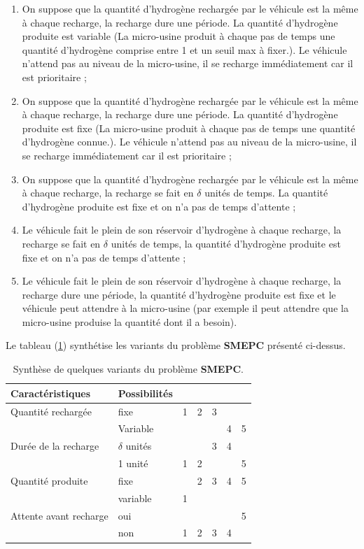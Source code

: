 {\begin{enumerate}%
	\item On suppose que la quantité d'hydrogène rechargée par le véhicule est la même à chaque recharge, la recharge dure une période. La quantité d'hydrogène produite est variable (La micro-usine produit à chaque pas de temps une quantité d'hydrogène comprise entre 1 et un seuil max à fixer.). Le véhicule n'attend pas au niveau de la micro-usine, il se recharge immédiatement car il est prioritaire ;
	\item On suppose que la quantité d'hydrogène rechargée par le véhicule est la même à chaque recharge, la recharge dure une période. La quantité d'hydrogène produite est fixe (La micro-usine produit à chaque pas de temps une quantité d'hydrogène connue.). Le véhicule n'attend pas au niveau de la micro-usine, il se recharge immédiatement car il est prioritaire ;
	\item On suppose que la quantité d'hydrogène rechargée par le véhicule est la même à chaque recharge, la recharge se fait en $\delta$ unités de temps. La quantité d'hydrogène produite est fixe et on n'a pas de temps d'attente  ;
	\item Le véhicule fait le plein de son réservoir d'hydrogène à chaque recharge, la recharge se fait en $\delta$ unités de temps, la quantité d'hydrogène produite est fixe et on n'a pas de temps d'attente ;
	\item Le véhicule fait le plein de son réservoir d'hydrogène à chaque recharge, la recharge dure une période, la quantité d'hydrogène produite est fixe et le véhicule peut attendre à la micro-usine (par exemple il peut attendre que la micro-usine produise la quantité dont il a besoin).
\end{enumerate}

Le tableau (\ref{syn_variant}) synthétise les variants du problème \textbf{SMEPC} présenté ci-dessus.

\begin{table}[H]
	\begin{center}

\begin{tabular}{|l|l|l|l|l|l|l|}
	\hline
		Caractéristiques & Possibilités &  &&&&\\ \hline
	Quantité rechargée & fixe & 1&2&3&&\\
	& Variable &  &&&4&5\\\hline
	Durée de la recharge &  $\delta$ unités &  &&3&4&\\
	& 1 unité & 1&2&&&5\\\hline
	Quantité produite &fixe &  &2&3&4&5\\
	& variable &1  &&&&\\
	\hline
	Attente avant recharge & oui & &&&&5\\
	& non & 1&2&3&4&\\
	\hline
\end{tabular}
\end{center}
\caption[Synthèse de quelques variants du problème \textbf{SMEPC} ]{Synthèse de quelques variants du problème \textbf{SMEPC}.\label{syn_variant} }
\end{table}

}
